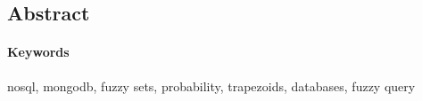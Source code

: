 \begin{otherlanguage}{american}
\section{Abstract}


\paragraph{Keywords} nosql, mongodb, fuzzy sets, probability, trapezoids, databases, fuzzy query

\end{otherlanguage}

\newpage
